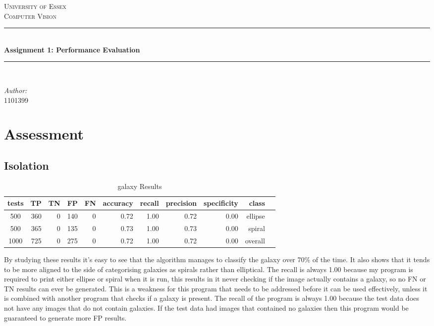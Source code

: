 \documentclass{article}
\newcommand{\HRule}{\rule{\linewidth}{0.5mm}}
\begin{document}
\begin{titlepage}
\begin{center}

\textsc{\LARGE University of Essex}\\[1.5cm]
\textsc{\Large Computer Vision}\\[0.5cm]

\HRule \\[0.4cm]
{ \huge \bfseries Assignment 1: Performance Evaluation \\[0.4cm] }
\HRule \\[1.5cm]

\begin{minipage}{1.0\textwidth}
\begin{flushleft} \large
\emph{Author:}\\
1101399
\end{flushleft}
\end{minipage}

\vfill

\end{center}
\end{titlepage}

\section{Assessment}
\subsection{Isolation}

\begin{table}[h]
\caption{galaxy Results}
\centering
\begin{tabular}{c rrrrrrrrrr}
\hline \hline
tests & TP & TN & FP & FN & accuracy & recall & precision & specificity & class \\[0.5ex]
\hline
500 & 360 & 0 & 140 & 0 & 0.72 & 1.00 & 0.72 & 0.00 & ellipse \\
500 & 365 & 0 & 135 & 0 & 0.73 & 1.00 & 0.73 & 0.00 & spiral \\
1000 & 725 & 0 & 275 & 0 & 0.72 & 1.00 & 0.72 & 0.00 & overall \\
\hline
\end{tabular}
\end{table}

By studying these results it's easy to see that the algorithm manages to classify the galaxy over 70\% of the time. It also shows that it tends to be more aligned to the side of categorising galaxies as spirals rather than elliptical. The recall is always 1.00 because my program is required to print either ellipse or spiral when it is run, this results in it never checking if the image actually contains a galaxy, so no FN or TN results can ever be generated. This is a weakness for this program that needs to be addressed before it can be used effectively, unless it is combined with another program that checks if a galaxy is present. The recall of the program is always 1.00 because the test data does not have any images that do not contain galaxies. If the test data had images that contained no galaxies then this program would be guaranteed to generate more FP results. 
\end{document}
